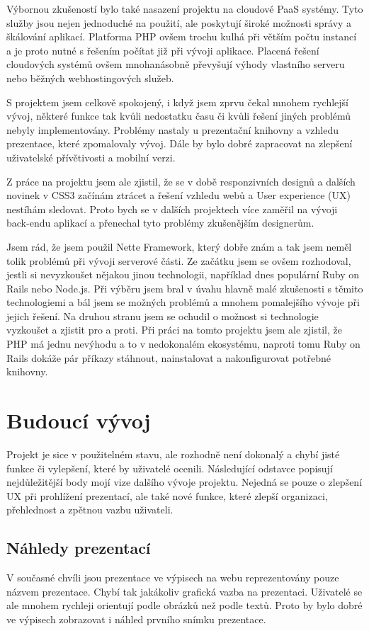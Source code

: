 \documentclass[11pt,twoside,a4paper]{book}
\newcommand*{\nomExpl}[2]{#2 (#1)\nomenclature{#1}{#2}} 	%
\begin{document}
Výbornou zkušeností bylo také nasazení projektu na cloudové PaaS systémy. Tyto služby jsou nejen jednoduché na použití, ale poskytují široké možnosti správy a škálování aplikací. Platforma PHP ovšem trochu kulhá při větším počtu instancí a je proto nutné s řešením počítat již při vývoji aplikace. Placená řešení cloudových systémů ovšem mnohanásobně převyšují výhody vlastního serveru nebo běžných webhostingových služeb.

S projektem jsem celkově spokojený, i když jsem zprvu čekal mnohem rychlejší vývoj, některé funkce tak kvůli nedostatku času či kvůli řešení jiných problémů nebyly implementovány. Problémy nastaly u prezentační knihovny a vzhledu prezentace, které zpomalovaly vývoj. Dále by bylo dobré zapracovat na zlepšení uživatelské přívětivosti a mobilní verzi.

Z práce na projektu jsem ale zjistil, že se v době responzivních designů a dalších novinek v CSS3 začínám ztrácet a řešení vzhledu webů a \nomExpl{UX}{User experience} nestíhám sledovat. Proto bych se v dalších projektech více zaměřil na vývoji back-endu aplikací a přenechal tyto problémy zkušenějším designerům.

Jsem rád, že jsem použil Nette Framework, který dobře znám a tak jsem neměl tolik problémů při vývoji serverové části. Ze začátku jsem se ovšem rozhodoval, jestli si nevyzkoušet nějakou jinou technologii, například dnes populární Ruby on Rails nebo Node.js. Při výběru jsem bral v úvahu hlavně malé zkušenosti s těmito technologiemi a bál jsem se možných problémů a mnohem pomalejšího vývoje při jejich řešení. Na druhou stranu jsem se ochudil o možnost si technologie vyzkoušet a zjistit pro a proti. Při práci na tomto projektu jsem ale zjistil, že PHP má jednu nevýhodu a to v nedokonalém ekosystému, naproti tomu Ruby on Rails dokáže pár příkazy stáhnout, nainstalovat a nakonfigurovat potřebné knihovny.

\section{Budoucí vývoj}
Projekt je sice v použitelném stavu, ale rozhodně není dokonalý a chybí jisté funkce či vylepšení, které by uživatelé ocenili. Následující odstavce popisují nejdůležitější body mojí vize dalšího vývoje projektu. Nejedná se pouze o zlepšení UX při prohlížení prezentací, ale také nové funkce, které zlepší organizaci, přehlednost a zpětnou vazbu uživateli.

\subsection{Náhledy prezentací}
V současné chvíli jsou prezentace ve výpisech na webu reprezentovány pouze názvem prezentace. Chybí tak jakákoliv grafická vazba na prezentaci. Uživatelé se ale mnohem rychleji orientují podle obrázků než podle textů. Proto by bylo dobré ve výpisech zobrazovat i náhled prvního snímku prezentace.
\end{document}
